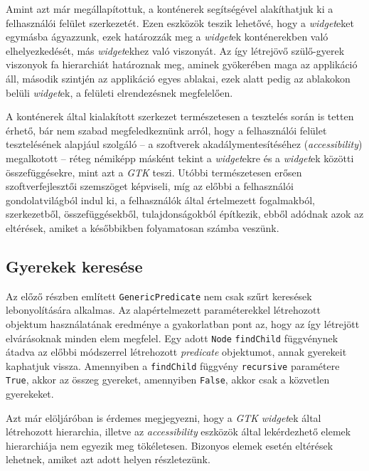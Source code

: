Amint azt már megállapítottuk, a konténerek segítségével alakíthatjuk ki a felhasználói felület szerkezetét. Ezen eszközök teszik lehetővé, hogy a \textit{widget}eket egymásba ágyazzunk, ezek határozzák meg a \textit{widget}ek konténerekben való elhelyezkedését, más \textit{widget}ekhez való viszonyát. Az így létrejövő szülő-gyerek viszonyok fa hierarchiát határoznak meg, aminek gyökerében maga az applikáció áll, második szintjén az applikáció egyes ablakai, ezek alatt pedig az ablakokon belüli \textit{widget}ek, a felületi elrendezésnek megfelelően.

A konténerek által kialakított szerkezet természetesen a tesztelés során is tetten érhető, bár nem szabad megfeledkeznünk arról, hogy a felhasználói felület tesztelésének alapjául szolgáló -- a szoftverek akadálymentesítéséhez (\textit{accessibility}) megalkotott -- réteg némiképp másként tekint a \textit{widget}ekre és a \textit{widget}ek közötti összefüggésekre, mint azt a \textit{GTK} teszi. Utóbbi természetesen erősen szoftverfejlesztői szemszöget képviseli, míg az előbbi a felhasználói gondolatvilágból indul ki, a felhasználók által értelmezett fogalmakból, szerkezetből, összefüggésekből, tulajdonságokból építkezik, ebből adódnak azok az eltérések, amiket a későbbikben folyamatosan számba veszünk.

\subsection{Gyerekek keresése}

Az előző részben említett \texttt{GenericPredicate} nem csak szűrt keresések lebonyolítására alkalmas. Az alapértelmezett paraméterekkel létrehozott objektum használatának eredménye a gyakorlatban pont az, hogy az így létrejött elvárásoknak minden elem megfelel. Egy adott \texttt{Node} \texttt{findChild} függvénynek átadva az előbbi módszerrel létrehozott \textit{predicate} objektumot, annak gyerekeit kaphatjuk vissza. Amennyiben a \texttt{findChild} függvény \texttt{recursive} paramétere \texttt{True}, akkor az összeg gyereket, amennyiben \texttt{False}, akkor csak a közvetlen gyerekeket.

Azt már elöljáróban is érdemes megjegyezni, hogy a \textit{GTK} \textit{widget}ek által létrehozott hierarchia, illetve az \textit{accessibility} eszközök által lekérdezhető elemek hierarchiája nem egyezik meg tökéletesen. Bizonyos elemek esetén eltérések lehetnek, amiket azt adott helyen részletezünk.
